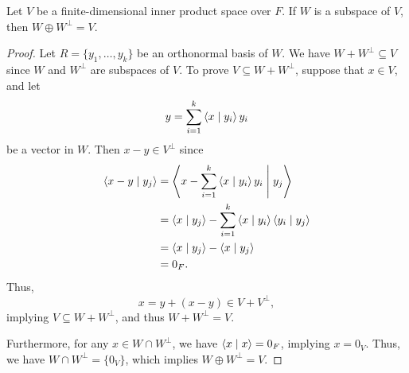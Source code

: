 \begin{theorem}
  Let $V$ be a finite-dimensional inner product space over $F$.
  If $W$ is a subspace of $V$, then $W \oplus W^\perp = V$.
\end{theorem}
\begin{proof}
  Let $R = \{y_1, \dots, y_k\}$ be an orthonormal basis of $W$.
  We have $W + W^\perp \subseteq V$ since $W$ and $W^\perp$ are subspaces of
  $V$.
  To prove $V \subseteq W + W^\perp$, suppose that $x \in V$, and let
  \begin{equation*}
    y = \sum_{i=1}^k \left\langle x \; \middle| \; y_i \right\rangle y_i
  \end{equation*}
  be a vector in $W$.
  Then $x - y \in V^\perp$ since
  \begin{align*}
    \left\langle x - y \; \middle| \; y_j \right\rangle
    &= \left\langle x - \sum_{i=1}^k \left\langle x \; \middle| \; y_i \right\rangle y_i \; \middle| \; y_j \right\rangle \\
    &= \left\langle x \; \middle| \; y_j \right\rangle - \sum_{i=1}^k \left\langle x \; \middle| \; y_i \right\rangle \left\langle y_i \; \middle| \; y_j \right\rangle \\
    &= \left\langle x \; \middle| \; y_j \right\rangle - \left\langle x \; \middle| \; y_j \right\rangle \\
    &= 0_F.
  \end{align*}
  Thus,
  \begin{equation*}
    x = y + (x - y) \in V + V^\perp,
  \end{equation*}
  implying $V \subseteq W + W^\perp$, and thus $W + W^\perp = V$.

  Furthermore, for any $x \in W \cap W^\perp$, we have $\left\langle x \; \middle| \; x \right\rangle = 0_F$,
  implying $x = 0_V$.
  Thus, we have $W \cap W^\perp = \{0_V\}$, which implies
  $W \oplus W^\perp = V$.
\end{proof}

